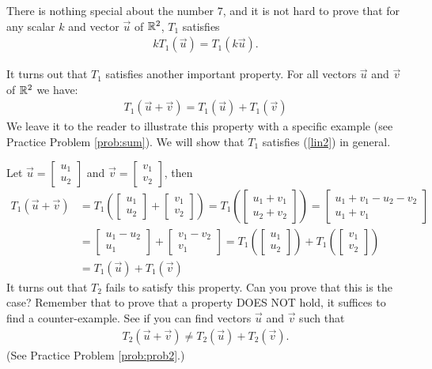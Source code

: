 \documentclass{ximera}
\begin{document}
\begin{exploration}
There is nothing special about the number $7$, and it is not hard to prove that for any scalar $k$ and vector $\vec{u}$ of $\mathbb{R}^2$, $T_1$ satisfies
\begin{align}\label{lin1} kT_1(\vec{u})= T_1(k\vec{u}).\end{align}

It turns out that $T_1$ satisfies another important property. For all vectors $\vec{u}$ and $\vec{v}$ of $\mathbb{R}^2$ we have:
\begin{align}\label{lin2} T_1(\vec{u}+\vec{v}) = T_1(\vec{u})+T_1(\vec{v})\end{align}
We leave it to the reader to illustrate this property with a specific example (see Practice Problem \ref{prob:sum}).  We will show that $T_1$ satisfies (\ref{lin2}) in general.

Let $\vec{u}=\begin{bmatrix}
u_1\\
u_2
\end{bmatrix}$ and $\vec{v}=\begin{bmatrix}
v_1\\
v_2
\end{bmatrix}$, then
\begin{align*}
T_1(\vec{u}+\vec{v})&=T_1\left(\begin{bmatrix}
u_1\\
u_2
\end{bmatrix}+\begin{bmatrix}
v_1\\
v_2
\end{bmatrix}\right)=T_1\left(\begin{bmatrix}
u_1+v_1\\
u_2+v_2
\end{bmatrix}\right)=\begin{bmatrix}
u_1+v_1-u_2-v_2\\
u_1+v_1
\end{bmatrix}\\
&=\begin{bmatrix}
u_1-u_2\\
u_1
\end{bmatrix}+\begin{bmatrix}
v_1-v_2\\
v_1
\end{bmatrix}=T_1\left(\begin{bmatrix}
u_1\\
u_2
\end{bmatrix}\right)+T_1\left(\begin{bmatrix}
v_1\\
v_2
\end{bmatrix}\right)\\
&=T_1(\vec{u})+T_1(\vec{v})
\end{align*}
It turns out that $T_2$ fails to satisfy this property.  Can you prove that this is the case?  Remember that to prove that a property DOES NOT hold, it suffices to find a counter-example.  See if you can find vectors $\vec{u}$ and $\vec{v}$ such that 
\begin{align}\label{t2}T_2(\vec{u}+\vec{v}) \neq T_2(\vec{u})+T_2(\vec{v}).\end{align}
(See Practice Problem \ref{prob:prob2}.) 
\end{exploration}
\end{document}
